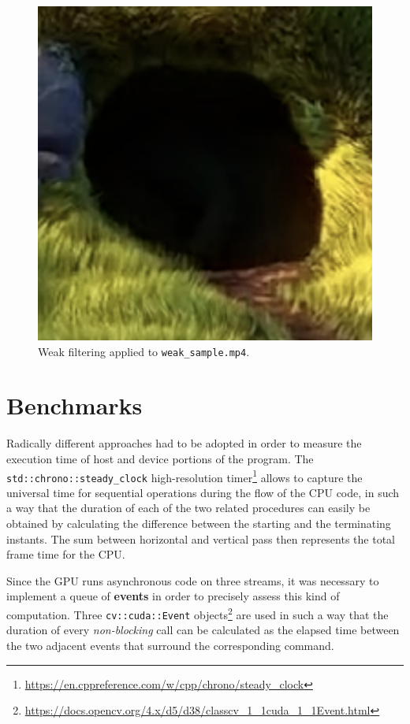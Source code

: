 \documentclass{article}
\begin{document}
\begin{figure}[!htbp]
  \centering
  \includegraphics[width=\textwidth]{weak1.png}
  \caption{Weak filtering applied to \texttt{weak\_sample.mp4}.}
  \label{weak1}
\end{figure}

\section{Benchmarks}
Radically different approaches had to be adopted in order to measure the execution time of host and device portions of the program. The \texttt{std::chrono::steady\_clock} high-resolution timer\footnote{\url{https://en.cppreference.com/w/cpp/chrono/steady_clock}} allows to capture the universal time for sequential operations during the flow of the CPU code, in such a way that the duration of each of the two related procedures can easily be obtained by calculating the difference between the starting and the terminating instants. The sum between horizontal and vertical pass then represents the total frame time for the CPU.

Since the GPU runs asynchronous code on three streams, it was necessary to implement a queue of \textbf{events} in order to precisely assess this kind of computation. Three \texttt{cv::cuda::Event} objects\footnote{\url{https://docs.opencv.org/4.x/d5/d38/classcv_1_1cuda_1_1Event.html}} are used in such a way that the duration of every \textit{non-blocking} call can be calculated as the elapsed time between the two adjacent events that surround the corresponding command.
\end{document}
